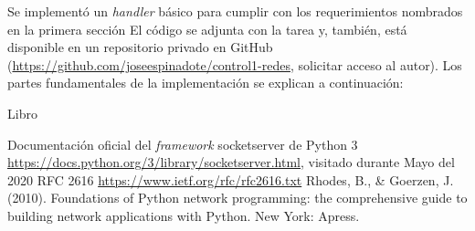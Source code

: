\documentclass{article}
\begin{document}
Se implementó un \textit{handler} básico para cumplir con los requerimientos nombrados en la primera sección El código se adjunta con la tarea y, también, está disponible en un repositorio privado en GitHub (\url{https://github.com/joseespinadote/control1-redes}, solicitar acceso al autor). Los partes fundamentales de la implementación se explican a continuación:






\cite{libro_redes_python}Libro
\begin{thebibliography}{9}
 Documentación oficial del \textit{framework} socketserver de Python 3 \url{https://docs.python.org/3/library/socketserver.html}, visitado durante Mayo del 2020
 RFC 2616 \url{https://www.ietf.org/rfc/rfc2616.txt}
 Rhodes, B., \& Goerzen, J. (2010). Foundations of Python network programming: the comprehensive guide to building network applications with Python. New York: Apress.
\end{thebibliography}
\end{document}
